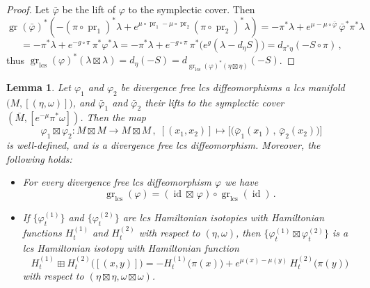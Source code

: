 \documentclass{amsart}
\DeclareMathOperator{\gr}{gr}
\DeclareMathOperator{\pr}{pr}
\DeclareMathOperator{\lcs}{lcs}
\DeclareMathOperator{\id}{id}
\newtheorem{lemma}[thm]{Lemma}
\theoremstyle{remark}
\begin{document}
\begin{proof}
Let $\bar{\varphi}$ be the lift of $\varphi$
to the symplectic cover.
Then
\[
\gr (\bar{\varphi})^{\ast}
( - (\pi \circ \pr_1)^{\ast} \lambda
+ e^{\mu \circ \pr_1 - \mu \circ \pr_2} (\pi \circ \pr_2)^{\ast}\lambda)
= - \pi^{\ast} \lambda
+ e^{\mu - \mu \circ \bar{\varphi}} \, \bar{\varphi}^{\ast} \pi^{\ast} \lambda
\]
\[
= - \pi^{\ast} \lambda + e^{-g \circ \pi} \, \pi^{\ast} \varphi^{\ast} \lambda
= - \pi^{\ast} \lambda + e^{-g \circ \pi} \, \pi^{\ast} \big(e^g (\lambda - d_{\eta}S)\big)
= d_{\pi^{\ast} \eta} (- S \circ \pi) \,,
\]
thus $\gr_{\lcs} (\varphi)^{\ast} (\lambda \boxtimes \lambda)
= d_{\eta} (- S)
= d_{\gr_{\lcs}(\varphi)^{\ast} (\eta \boxtimes \eta) } (-S)$.
\end{proof}

\begin{lemma}\label{lemma: product of lcs diffeomorphisms}
Let $\varphi_1$ and $\varphi_2$
be divergence free lcs diffeomorphisms
a lcs manifold $\big( M , [(\eta, \omega)] \big)$,
and $\bar{\varphi}_1$ and $\bar{\varphi}_2$
their lifts to the symplectic cover
$(\bar{M}, [e^{-\mu} \pi^{\ast}\omega])$.
Then the map
\[
\varphi_1 \boxtimes \varphi_2:
M \boxtimes M \rightarrow M \boxtimes M \,,\;
[(x_1, x_2)] \mapsto \big[\big( \bar{\varphi}_1 (x_1) \,,\, \bar{\varphi}_2 (x_2) \big)\big]
\]
is well-defined,
and is a divergence free lcs diffeomorphism.
Moreover,
the following holds:
\begin{itemize}
\item[(i)] For every divergence free lcs diffeomorphism $\varphi$
we have
\[
\gr_{\lcs} (\varphi) = (\id \boxtimes\, \varphi) \circ \gr_{\lcs} (\id) \,.
\]
\item[(ii)] If $\{\varphi_t^{(1)}\}$ and $\{\varphi_t^{(2)}\}$
are lcs Hamiltonian isotopies
with Hamiltonian functions $H_t^{(1)}$ and $H_t^{(2)}$
with respect to $(\eta, \omega)$,
then $\big\{ \varphi_t^{(1)} \boxtimes \varphi_t^{(2)} \big\}$
is a lcs Hamiltonian isotopy
with Hamiltonian function
\[
H_t^{(1)} \boxplus H_t^{(2)} \big( [(x, y)] \big)
= - H_t^{(1)} \big(\pi(x)\big) + e^{\mu(x) - \mu (y)} \, H_t^{(2)} \big(\pi(y)\big)
\]
with respect to $(\eta \boxtimes \eta, \omega \boxtimes \omega)$.
\end{itemize}
\end{lemma}
\end{document}
